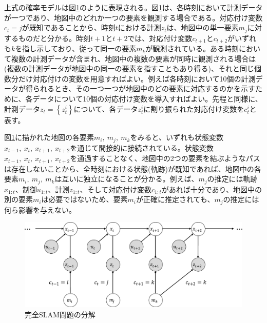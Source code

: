 \documentclass[dvipdfmx,a4paper]{jsarticle}
\begin{document}
上式の確率モデルは図\ref{fig:full-slam-with-associations}のように表現される。図\ref{fig:full-slam-with-associations}は、各時刻において計測データが一つであり、地図中のどれか一つの要素を観測する場合である。対応付け変数$c_t = j$が既知であることから、時刻$t$における計測$z_t$は、地図中の単一要素$m_j$に対するものだと分かる。時刻$t + 1$と$t + 2$では、対応付け変数$c_{t + 1}$と$c_{t + 2}$がいずれも$k$を指し示しており、従って同一の要素$m_k$が観測されている。ある時刻において複数の計測データが含まれ、地図中の複数の要素が同時に観測される場合は(複数の計測データが地図中の同一の要素を指すこともあり得る)、それと同じ個数分だけ対応付けの変数を用意すればよい。例えば各時刻において10個の計測データが得られるとき、その一つ一つが地図中のどの要素に対応するのかを示すために、各データについて10個の対応付け変数を導入すればよい。先程と同様に、計測データ$z_t = \left\{ z_t^i \right\}$について、各データ$z_t^i$に割り振られた対応付け変数を$c_t^i$と表す。\newline

図\ref{fig:full-slam-with-associations}に描かれた地図の各要素$m_i, \ m_j, \ m_k$をみると、いずれも状態変数$x_{t - 1}, \ x_t, \ x_{t + 1}, \ x_{t + 2}$を通じて間接的に接続されている。状態変数$x_{t - 1}, \ x_t, \ x_{t + 1}, \ x_{t + 2}$を通過することなく、地図中の2つの要素を結ぶようなパスは存在しないことから、全時刻における状態(軌跡)が既知であれば、地図中の各要素$m_i, \ m_j, \ m_k$は互いに独立になることが分かる。例えば、$m_j$の推定には軌跡$x_{1 : t}$、制御$u_{1 : t}$、計測$z_{1 : t}$、そして対応付け変数$c_{1 : t}$があれば十分であり、地図中の別の要素$m_i$は必要ではないため、要素$m_i$が正確に推定されても、$m_j$の推定には何ら影響を与えない。\newline

\begin{figure}[htbp]
	\centering
	\includegraphics[keepaspectratio, scale=0.5]{figures/full-slam-with-associations.pdf}
	\caption{完全SLAM問題の分解}
	\label{fig:full-slam-with-associations}
\end{figure}
\end{document}
